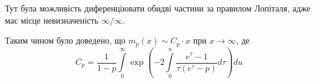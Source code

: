 Тут була можливість диференціювати обидві частини за правилом Лопіталя, адже має місце невизначеність $\infty / \infty$.

Таким чином було доведено, що $m_{p}(x) \sim C_{p} \cdot x$ при $x \rightarrow \infty$, де
\begin{equation}
C_{p} = \frac{1}{1-p} \int\limits_0^\infty \exp\left( -2\int\limits_0^u \frac{e^{\tau} - 1}{\tau(e^\tau - p)} d\tau  \right) du
\end{equation}
